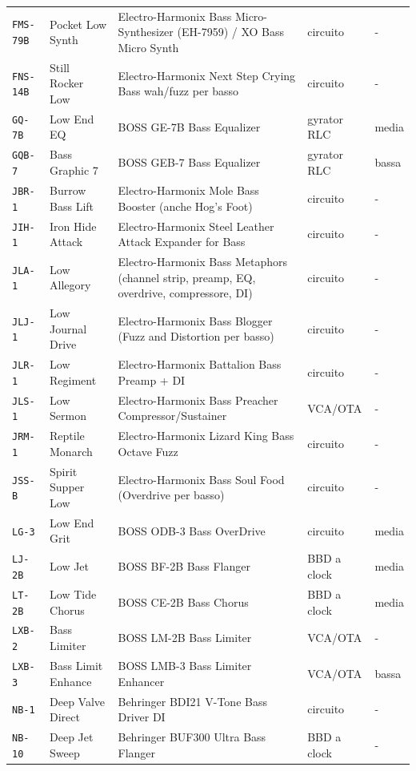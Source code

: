 \begin{xltabular}{\linewidth}{@{}l l X l l@{}}
\texttt{FMS-79B} & Pocket Low Synth & Electro-Harmonix Bass Micro-Synthesizer (EH-7959) / XO Bass Micro Synth & circuito & -\\
\texttt{FNS-14B} & Still Rocker Low & Electro-Harmonix Next Step Crying Bass wah/fuzz per basso & circuito & -\\
\texttt{GQ-7B} & Low End EQ & BOSS GE-7B Bass Equalizer & gyrator RLC & media\\
\texttt{GQB-7} & Bass Graphic 7 & BOSS GEB-7 Bass Equalizer & gyrator RLC & bassa\\
\texttt{JBR-1} & Burrow Bass Lift & Electro-Harmonix Mole Bass Booster (anche Hog's Foot) & circuito & -\\
\texttt{JIH-1} & Iron Hide Attack & Electro-Harmonix Steel Leather Attack Expander for Bass & circuito & -\\
\texttt{JLA-1} & Low Allegory & Electro-Harmonix Bass Metaphors (channel strip, preamp, EQ, overdrive, compressore, DI) & circuito & -\\
\texttt{JLJ-1} & Low Journal Drive & Electro-Harmonix Bass Blogger (Fuzz and Distortion per basso) & circuito & -\\
\texttt{JLR-1} & Low Regiment & Electro-Harmonix Battalion Bass Preamp + DI & circuito & -\\
\texttt{JLS-1} & Low Sermon & Electro-Harmonix Bass Preacher Compressor/Sustainer & VCA/OTA & -\\
\texttt{JRM-1} & Reptile Monarch & Electro-Harmonix Lizard King Bass Octave Fuzz & circuito & -\\
\texttt{JSS-B} & Spirit Supper Low & Electro-Harmonix Bass Soul Food (Overdrive per basso) & circuito & -\\
\texttt{LG-3} & Low End Grit & BOSS ODB-3 Bass OverDrive & circuito & media\\
\texttt{LJ-2B} & Low Jet & BOSS BF-2B Bass Flanger & BBD a clock & media\\
\texttt{LT-2B} & Low Tide Chorus & BOSS CE-2B Bass Chorus & BBD a clock & media\\
\texttt{LXB-2} & Bass Limiter & BOSS LM-2B Bass Limiter & VCA/OTA & -\\
\texttt{LXB-3} & Bass Limit Enhance & BOSS LMB-3 Bass Limiter Enhancer & VCA/OTA & bassa\\
\texttt{NB-1} & Deep Valve Direct & Behringer BDI21 V-Tone Bass Driver DI & circuito & -\\
\texttt{NB-10} & Deep Jet Sweep & Behringer BUF300 Ultra Bass Flanger & BBD a clock & -\\

\end{xltabular}
